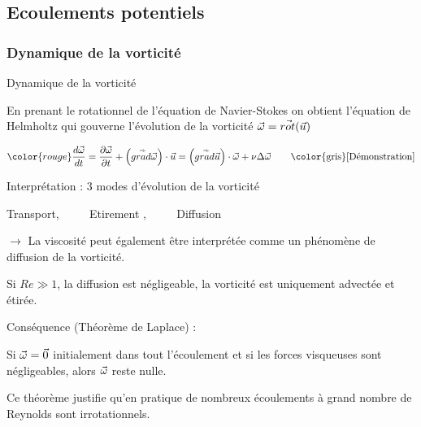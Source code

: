 \subsection{Ecoulements potentiels}
\subsubsection{Dynamique de la vorticité}
\begin{frame}{Dynamique de la vorticité} \hypertarget{frame:toto}{}

\small

\vspace{0mm}

En prenant le rotationnel de l'équation de Navier-Stokes on obtient l'équation de Helmholtz 
qui gouverne l'évolution de la vorticité $\vec{\omega} = \vec{rot} ( \vec{u} ) $

\begin{equation}
	{\color{rouge}
\ddt{\myvec{\omega}} =  \dpdt{\myvec{\omega}} + \left( \mytensor{grad} \myvec{\omega} \right) \cdot  \myvec{u} 
  =  \left( \mytensor{grad} \myvec{u} \right) \cdot  \myvec{\omega} +
  \nu \Delta \myvec{\omega} \qquad }\mbox{{\color{gris}[Démonstration]}}
\end{equation}

Interprétation :  3 modes d'évolution de la vorticité

Transport, $\qquad$ Etirement , $\qquad$ Diffusion



$\longrightarrow$ La viscosité peut également être interprétée comme un phénomène de {\color{red} diffusion de la vorticité.}

Si $Re \gg 1$, la diffusion est négligeable, la vorticité est uniquement advectée et étirée.

\medskip
Conséquence {\color{red} (Théorème de Laplace)} :

Si $\vec{\omega} = \vec{0}$ initialement dans tout l'écoulement
et si les forces visqueuses sont négligeables, alors $\vec{\omega}$ reste nulle.


\medskip Ce théorème justifie qu'en pratique de nombreux écoulements à grand nombre de Reynolds sont irrotationnels.





\end{frame}

